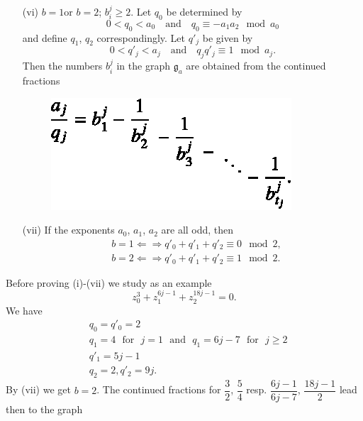 \begin{theorem*}
\begin{itemize}
\item[\rm(vi)] $b=1$\pageoriginale or $b=2$; $b^{j}_{i}\geq 2$. Let $q_{0}$ be determined by
$$
0<q_{0}<a_{0}\quad\text{and}\quad q_{0}\equiv - a_{1}a_{2}\mod a_{0}
$$
and define $q_{1}$, $q_{2}$ correspondingly. Let $q'_{j}$ be given by
$$
0<q'_{j}<a_{j}\text{~~ and~~ } q_{j}q'_{j}\equiv 1\mod a_{j}.
$$
Then the numbers $b^{j}_{i}$ in the graph $\mathfrak{g}_{a}$ are obtained from the continued fractions
\begin{figure}[H]
\centering
\includegraphics{src/chap11/fig10.eps}
\end{figure}

\item[\rm(vii)] If the exponents $a_{0}$, $a_{1}$, $a_{2}$ are all odd, then
\begin{align*}
& b=1\Leftarrow \Rightarrow q'_{0}+q'_{1}+q'_{2}\equiv 0\mod 2,\\[3pt]
& b=2\Leftarrow \Rightarrow q'_{0}+q'_{1}+q'_{2}\equiv 1\mod 2.
\end{align*}
\end{itemize}
\end{theorem*}

Before proving (i)-(vii) we study as an example
\begin{equation*}
z^{3}_{0}+z^{6j-1}_{1}+z^{18j-1}_{2}=0.\tag{2}\label{art11-sec4-eq2}
\end{equation*}
We have
\begin{align*}
& q_{0}=q'_{0}=2\\[3pt]
& q_{1}=4\text{~ for~ } j=1\text{~ and~ } q_{1}=6j-7\text{~ for~ } j\geq 2\\[3pt]
& q'_{1}=5j-1\\[3pt]
& q_{2}=2, q'_{2}=9j.
\end{align*}
By (vii) we get $b=2$. The continued fractions for $\dfrac{3}{2}$, $\dfrac{5}{4}$ resp. $\dfrac{6j-1}{6j-7}$, $\dfrac{18j-1}{2}$ lead then to the graph

\eject

